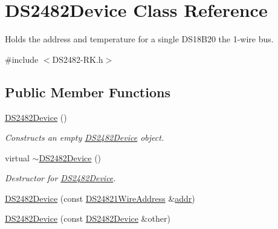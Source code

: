\hypertarget{class_d_s2482_device}{}\section{D\+S2482\+Device Class Reference}
\label{class_d_s2482_device}


Holds the address and temperature for a single D\+S18\+B20 the 1-\/wire bus.  




{\ttfamily \#include $<$D\+S2482-\/\+R\+K.\+h$>$}

\subsection*{Public Member Functions}
\begin{DoxyCompactItemize}
\item 
\mbox{\label{class_d_s2482_device_a4a69ea2cd0957ecade28deb98f9ec515}} 
\mbox{\hyperlink{class_d_s2482_device_a4a69ea2cd0957ecade28deb98f9ec515}{D\+S2482\+Device}} ()
\begin{DoxyCompactList}\small\item\em Constructs an empty \mbox{\hyperlink{class_d_s2482_device}{D\+S2482\+Device}} object. \end{DoxyCompactList}\item 
\mbox{\label{class_d_s2482_device_a3fd7f9463d2660fa2feca97d51924de0}} 
virtual \mbox{\hyperlink{class_d_s2482_device_a3fd7f9463d2660fa2feca97d51924de0}{$\sim$\+D\+S2482\+Device}} ()
\begin{DoxyCompactList}\small\item\em Destructor for \mbox{\hyperlink{class_d_s2482_device}{D\+S2482\+Device}}. \end{DoxyCompactList}\item 
\mbox{\hyperlink{class_d_s2482_device_adf7bcc962188f30c285057f28914bf2a}{D\+S2482\+Device}} (const \mbox{\hyperlink{class_d_s24821_wire_address}{D\+S24821\+Wire\+Address}} \&\mbox{\hyperlink{class_d_s2482_device_a83f16b37bc9a89032f9a3e4d096f2e1e}{addr}})
\item 
\mbox{\label{class_d_s2482_device_adcff18cd19c99b0c297d9dd70baf6bb7}} 
\mbox{\hyperlink{class_d_s2482_device_adcff18cd19c99b0c297d9dd70baf6bb7}{D\+S2482\+Device}} (const \mbox{\hyperlink{class_d_s2482_device}{D\+S2482\+Device}} \&other)

\end{DoxyCompactItemize}

